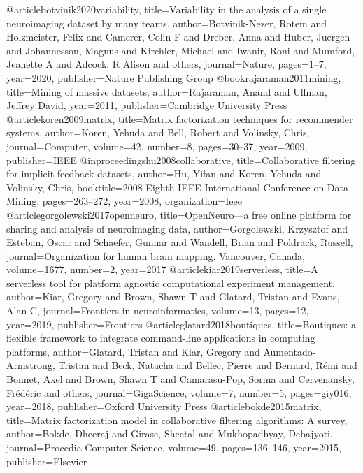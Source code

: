 @article{botvinik2020variability,
  title={Variability in the analysis of a single neuroimaging dataset by many teams},
  author={Botvinik-Nezer, Rotem and Holzmeister, Felix and Camerer, Colin F and Dreber, Anna and Huber, Juergen and Johannesson, Magnus and Kirchler, Michael and Iwanir, Roni and Mumford, Jeanette A and Adcock, R Alison and others},
  journal={Nature},
  pages={1--7},
  year={2020},
  publisher={Nature Publishing Group}
}
@book{rajaraman2011mining,
  title={Mining of massive datasets},
  author={Rajaraman, Anand and Ullman, Jeffrey David},
  year={2011},
  publisher={Cambridge University Press}
}
@article{koren2009matrix,
  title={Matrix factorization techniques for recommender systems},
  author={Koren, Yehuda and Bell, Robert and Volinsky, Chris},
  journal={Computer},
  volume={42},
  number={8},
  pages={30--37},
  year={2009},
  publisher={IEEE}
}
@inproceedings{hu2008collaborative,
  title={Collaborative filtering for implicit feedback datasets},
  author={Hu, Yifan and Koren, Yehuda and Volinsky, Chris},
  booktitle={2008 Eighth IEEE International Conference on Data Mining},
  pages={263--272},
  year={2008},
  organization={Ieee}
}
@article{gorgolewski2017openneuro,
  title={OpenNeuro—a free online platform for sharing and analysis of neuroimaging data},
  author={Gorgolewski, Krzysztof and Esteban, Oscar and Schaefer, Gunnar and Wandell, Brian and Poldrack, Russell},
  journal={Organization for human brain mapping. Vancouver, Canada},
  volume={1677},
  number={2},
  year={2017}
}
@article{kiar2019serverless,
  title={A serverless tool for platform agnostic computational experiment management},
  author={Kiar, Gregory and Brown, Shawn T and Glatard, Tristan and Evans, Alan C},
  journal={Frontiers in neuroinformatics},
  volume={13},
  pages={12},
  year={2019},
  publisher={Frontiers}
}
@article{glatard2018boutiques,
  title={Boutiques: a flexible framework to integrate command-line applications in computing platforms},
  author={Glatard, Tristan and Kiar, Gregory and Aumentado-Armstrong, Tristan and Beck, Natacha and Bellec, Pierre and Bernard, R{\'e}mi and Bonnet, Axel and Brown, Shawn T and Camarasu-Pop, Sorina and Cervenansky, Fr{\'e}d{\'e}ric and others},
  journal={GigaScience},
  volume={7},
  number={5},
  pages={giy016},
  year={2018},
  publisher={Oxford University Press}
}
@article{bokde2015matrix,
  title={Matrix factorization model in collaborative filtering algorithms: A survey},
  author={Bokde, Dheeraj and Girase, Sheetal and Mukhopadhyay, Debajyoti},
  journal={Procedia Computer Science},
  volume={49},
  pages={136--146},
  year={2015},
  publisher={Elsevier}
}
